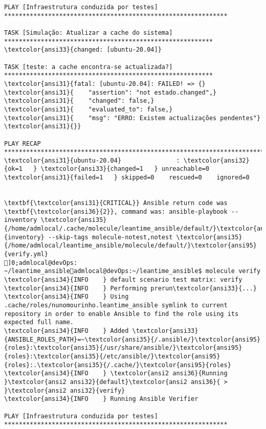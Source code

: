 \documentclass{scrartcl}
\begin{document}
\begin{Verbatim}
PLAY [Infraestrutura conduzida por testes] *************************************************************

TASK [Simulação: Atualizar a cache do sistema] *********************************************************
\textcolor{ansi33}{changed: [ubuntu-20.04]}

TASK [teste: a cache encontra-se actualizada?] *********************************************************
\textcolor{ansi31}{fatal: [ubuntu-20.04]: FAILED! => {}
\textcolor{ansi31}{    "assertion": "not estado.changed",}
\textcolor{ansi31}{    "changed": false,}
\textcolor{ansi31}{    "evaluated_to": false,}
\textcolor{ansi31}{    "msg": "ERRO: Existem actualizações pendentes"}
\textcolor{ansi31}{}}

PLAY RECAP *********************************************************************************************
\textcolor{ansi31}{ubuntu-20.04}               : \textcolor{ansi32}{ok=1   } \textcolor{ansi33}{changed=1   } unreachable=0    \textcolor{ansi31}{failed=1   } skipped=0    rescued=0    ignored=0


\textbf{\textcolor{ansi31}{CRITICAL}} Ansible return code was \textbf{\textcolor{ansi36}{2}}, command was: ansible-playbook --inventory \textcolor{ansi35}{/home/admlocal/.cache/molecule/leantime_ansible/default/}\textcolor{ansi95}{inventory} --skip-tags molecule-notest,notest \textcolor{ansi35}{/home/admlocal/leantime_ansible/molecule/default/}\textcolor{ansi95}{verify.yml}
]0;admlocal@devOps: ~/leantime_ansibleadmlocal@devOps:~/leantime_ansible$ molecule verify
\textcolor{ansi34}{INFO    } default scenario test matrix: verify
\textcolor{ansi34}{INFO    } Performing prerun\textcolor{ansi33}{...}
\textcolor{ansi34}{INFO    } Using .cache/roles/nunomourinho.leantime_ansible symlink to current repository in order to enable Ansible to find the role using its expected full name.
\textcolor{ansi34}{INFO    } Added \textcolor{ansi33}{ANSIBLE_ROLES_PATH}=~\textcolor{ansi35}{/.ansible/}\textcolor{ansi95}{roles}:\textcolor{ansi35}{/usr/share/ansible/}\textcolor{ansi95}{roles}:\textcolor{ansi35}{/etc/ansible/}\textcolor{ansi95}{roles}:.\textcolor{ansi35}{/.cache/}\textcolor{ansi95}{roles}
\textcolor{ansi34}{INFO    } \textcolor{ansi2 ansi36}{Running }\textcolor{ansi2 ansi32}{default}\textcolor{ansi2 ansi36}{ > }\textcolor{ansi2 ansi32}{verify}
\textcolor{ansi34}{INFO    } Running Ansible Verifier

PLAY [Infraestrutura conduzida por testes] *************************************************************


\end{Verbatim}
\end{document}
